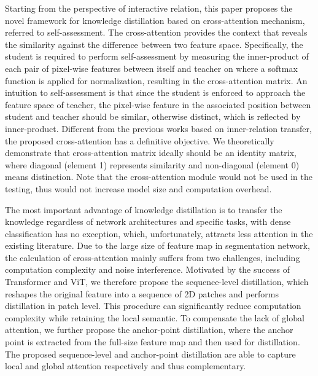 \documentclass[10pt,twocolumn,letterpaper]{article}
\begin{document}

Starting from the perspective of interactive relation, this paper proposes the novel framework for knowledge distillation based on cross-attention mechanism, referred to self-assessment. The cross-attention provides the context that reveals the similarity against the difference between two feature space. Specifically, the student is required to perform self-assessment by measuring the inner-product of each pair of pixel-wise features between itself and teacher on where a softmax function is applied for normalization, resulting in the cross-attention matrix. An intuition to self-assessment is that since the student is enforced to approach the feature space of teacher, the pixel-wise feature in the associated position between student and teacher should be similar, otherwise distinct, which is reflected by inner-product. Different from the previous works based on inner-relation transfer, the proposed cross-attention has a definitive objective. We theoretically demonstrate that cross-attention matrix ideally should be an identity matrix, where diagonal (element 1) represents similarity and non-diagonal (element 0) means distinction. Note that the cross-attention module would not be used in the testing, thus would not increase model size and computation overhead.
 
The most important advantage of knowledge distillation is to transfer the knowledge regardless of network architectures and specific tasks, with dense classification has no exception, which, unfortunately, attracts less attention in the existing literature. Due to the large size of feature map in segmentation network, the calculation of cross-attention mainly suffers from two challenges, including computation complexity and noise interference. 
Motivated by the success of Transformer and ViT, we therefore propose the sequence-level distillation, which reshapes the original feature into a sequence of 2D patches and performs distillation in patch level. This procedure can significantly reduce computation complexity while retaining the local semantic. To compensate the lack of global attention, we further propose the anchor-point distillation, where the anchor point is extracted from the full-size feature map and then used for distillation. The proposed sequence-level and anchor-point distillation are able to capture local and global attention respectively and thus complementary.
\end{document}
